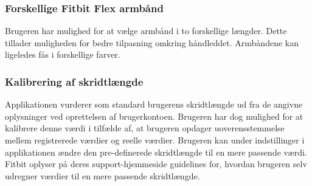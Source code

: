 \subsubsection{Forskellige Fitbit Flex armbånd}
Brugeren har mulighed for at vælge armbånd i to forskellige længder. Dette tillader muligheden for bedre tilpasning omkring håndleddet. Armbåndene kan ligeledes fås i forskellige farver.

\subsubsection{Kalibrering af skridtlængde}
Applikationen vurderer som standard brugerens skridtlængde ud fra de angivne oplysninger ved oprettelsen af brugerkontoen. Brugeren har dog mulighed for at kalibrere denne værdi i tilfælde af, at brugeren opdager uoverensstemmelse mellem registrerede værdier og reelle værdier. Brugeren kan under indstillinger i applikationen ændre den pre-definerede skridtlængde til en mere passende værdi. Fitbit oplyser på deres support-hjemmeside guidelines for, hvordan brugeren selv udregner værdier til en mere passende skridtlængde.   


